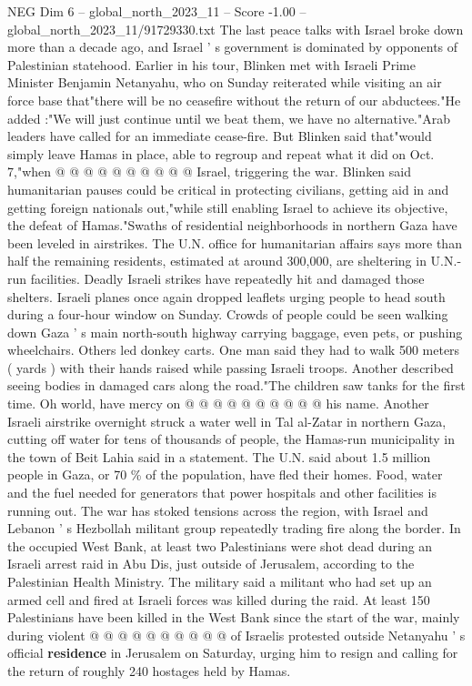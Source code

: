 \begin{textsample}{NEG Dim 6 – global\_north\_2023\_11 – Score -1.00 – global\_north\_2023\_11/91729330.txt}
The last peace talks with Israel broke down more than a decade ago, and Israel ' s government is dominated by opponents of Palestinian statehood.
Earlier in his tour, Blinken met with Israeli Prime Minister Benjamin Netanyahu, who on Sunday reiterated while visiting an air force base that"there will be no ceasefire without the return of our abductees."He added :"We will just continue until we beat them, we have no alternative."Arab leaders have called for an immediate cease-fire.
But Blinken said that"would simply leave Hamas in place, able to regroup and repeat what it did on Oct. 7,"when @ @ @ @ @ @ @ @ @ @ Israel, triggering the war.
Blinken said humanitarian pauses could be critical in protecting civilians, getting aid in and getting foreign nationals out,"while still enabling Israel to achieve its objective, the defeat of Hamas."Swaths of residential neighborhoods in northern Gaza have been leveled in airstrikes.
The U.N. office for humanitarian affairs says more than half the remaining residents, estimated at around 300,000, are sheltering in U.N.-run facilities.
Deadly Israeli strikes have repeatedly hit and damaged those shelters.
Israeli planes once again dropped leaflets urging people to head south during a four-hour window on Sunday.
Crowds of people could be seen walking down Gaza ' s main north-south highway carrying baggage, even pets, or pushing wheelchairs.
Others led donkey carts.
One man said they had to walk 500 meters ( yards ) with their hands raised while passing Israeli troops.
Another described seeing bodies in damaged cars along the road."The children saw tanks for the first time.
Oh world, have mercy on @ @ @ @ @ @ @ @ @ @ his name.
Another Israeli airstrike overnight struck a water well in Tal al-Zatar in northern Gaza, cutting off water for tens of thousands of people, the Hamas-run municipality in the town of Beit Lahia said in a statement.
The U.N. said about 1.5 million people in Gaza, or 70 \% of the population, have fled their homes.
Food, water and the fuel needed for generators that power hospitals and other facilities is running out.
The war has stoked tensions across the region, with Israel and Lebanon ' s Hezbollah militant group repeatedly trading fire along the border.
In the occupied West Bank, at least two Palestinians were shot dead during an Israeli arrest raid in Abu Dis, just outside of Jerusalem, according to the Palestinian Health Ministry.
The military said a militant who had set up an armed cell and fired at Israeli forces was killed during the raid.
At least 150 Palestinians have been killed in the West Bank since the start of the war, mainly during violent @ @ @ @ @ @ @ @ @ @ of Israelis protested outside Netanyahu ' s official \textbf{residence} in Jerusalem on Saturday, urging him to resign and calling for the return of roughly 240 hostages held by Hamas.

\end{textsample}
